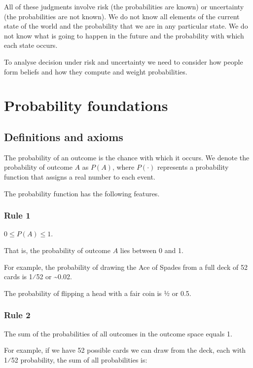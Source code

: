 \documentclass[
  letterpaper,
  DIV=11,
  numbers=noendperiod]{scrreprt}
\begin{document}
All of these judgments involve risk (the probabilities are known) or
uncertainty (the probabilities are not known). We do not know all
elements of the current state of the world and the probability that we
are in any particular state. We do not know what is going to happen in
the future and the probability with which each state occurs.

To analyse decision under risk and uncertainty we need to consider how
people form beliefs and how they compute and weight probabilities.

\hypertarget{probability-foundations}{%
\chapter{Probability foundations}\label{probability-foundations}}

\hypertarget{definitions-and-axioms}{%
\section{Definitions and axioms}\label{definitions-and-axioms}}

The probability of an outcome is the chance with which it occurs. We
denote the probability of outcome \(A\) as \(P(A)\), where \(P(\cdot)\)
represents a probability function that assigns a real number to each
event.

The probability function has the following features.

\hypertarget{rule-1}{%
\subsection{Rule 1}\label{rule-1}}

\(0 \leq P(A) \leq 1\).

That is, the probability of outcome \(A\) lies between 0 and 1.

For example, the probability of drawing the Ace of Spades from a full
deck of 52 cards is 1⁄52 or \textasciitilde0.02.

The probability of flipping a head with a fair coin is 1⁄2 or 0.5.

\hypertarget{rule-2}{%
\subsection{Rule 2}\label{rule-2}}

The sum of the probabilities of all outcomes in the outcome space equals
1.

For example, if we have 52 possible cards we can draw from the deck,
each with 1⁄52 probability, the sum of all probabilities is:
\end{document}

